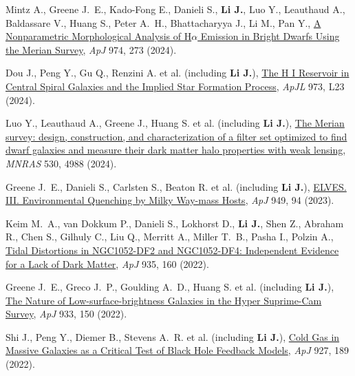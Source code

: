 \item Mintz A., Greene J.~E., Kado-Fong E., Danieli S., \textbf{Li J.}, Luo Y., Leauthaud A., Baldassare V., Huang S., Peter A.~H., Bhattacharyya J., Li M., Pan Y., \href{https://ui.adsabs.harvard.edu/abs/2024ApJ...974..273M}{A Nonparametric Morphological Analysis of H{\ensuremath{\alpha}} Emission in Bright Dwarfs Using the Merian Survey}, \textit{ApJ} 974, 273 (2024).

\item Dou J., Peng Y., Gu Q., Renzini A. et al. (including \textbf{Li J.}), \href{https://ui.adsabs.harvard.edu/abs/2024ApJ...973L..23D}{The H I Reservoir in Central Spiral Galaxies and the Implied Star Formation Process}, \textit{ApJL} 973, L23 (2024).

\item Luo Y., Leauthaud A., Greene J., Huang S. et al. (including \textbf{Li J.}), \href{https://ui.adsabs.harvard.edu/abs/2024MNRAS.530.4988L}{The Merian survey: design, construction, and characterization of a filter set optimized to find dwarf galaxies and measure their dark matter halo properties with weak lensing}, \textit{MNRAS} 530, 4988 (2024).

\item Greene J.~E., Danieli S., Carlsten S., Beaton R. et al. (including \textbf{Li J.}), \href{https://ui.adsabs.harvard.edu/abs/2023ApJ...949...94G}{ELVES. III. Environmental Quenching by Milky Way-mass Hosts}, \textit{ApJ} 949, 94 (2023).

\item Keim M.~A., van Dokkum P., Danieli S., Lokhorst D., \textbf{Li J.}, Shen Z., Abraham R., Chen S., Gilhuly C., Liu Q., Merritt A., Miller T.~B., Pasha I., Polzin A., \href{https://ui.adsabs.harvard.edu/abs/2022ApJ...935..160K}{Tidal Distortions in NGC1052-DF2 and NGC1052-DF4: Independent Evidence for a Lack of Dark Matter}, \textit{ApJ} 935, 160 (2022).

\item Greene J.~E., Greco J.~P., Goulding A.~D., Huang S. et al. (including \textbf{Li J.}), \href{https://ui.adsabs.harvard.edu/abs/2022ApJ...933..150G}{The Nature of Low-surface-brightness Galaxies in the Hyper Suprime-Cam Survey}, \textit{ApJ} 933, 150 (2022).

\item Shi J., Peng Y., Diemer B., Stevens A.~R. et al. (including \textbf{Li J.}), \href{https://ui.adsabs.harvard.edu/abs/2022ApJ...927..189S}{Cold Gas in Massive Galaxies as a Critical Test of Black Hole Feedback Models}, \textit{ApJ} 927, 189 (2022).

